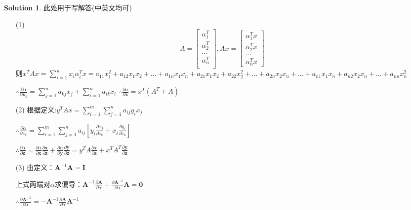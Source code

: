 \documentclass[a4paper,UTF8]{article}
\numberwithin{equation}{section}
\theoremstyle{definition}
\newtheorem*{solution}{Solution}
\def \y {\mathbf{y}}
\def \x {\mathbf{x}}
\def \z {\mathbf{z}}
\begin{document}
\begin{solution}
此处用于写解答(中英文均可) \\
\begin{enumerate}
\item[(1)]
		\begin{equation}
			A = \left[
			\begin{array}{c}
				\alpha_1^{T}  \\
				\alpha_2^{T} \\
				... \\
				\alpha_n^{T} \\
				
			\end{array}
			\right] ,   
			Ax = \left[
			\begin{array}{c}
				\alpha_1^{T}x  \\
				\alpha_2^{T}x \\
				...\\
				\alpha_n^{T}x 
			\end{array}
			\right]
		\end{equation}
		则$x^{T}Ax =  \sum\limits_{i=1}^{n}x_i\alpha_i^{T}x=a_{11}x_1^{2}+a_{12}x_1x_2+...+a_{1n}x_1x_n+a_{21}x_1x_2+a_{22}x_2^{2}+...+a_{2n}x_2x_n+...+a_{n1}x_1x_n+a_{n2}x_2x_n+...+a_{nn}x_n^{2}$
		
		$\therefore \frac{\partial \alpha}{\partial \x_k}=\sum\limits_{j=1}^{n}a_{kj}x_j+\sum\limits_{i=1}^{n}a_{ik}x_i$
          $\therefore \frac{\partial \alpha}{\partial \x}=x^{T}(A^{T}+A)$
          
\item[(2)]
	根据定义:$y^{T}Ax=\sum\limits_{i=1}^{m}\sum\limits_{j=1}^{n}a_{ij}y_ix_j$
	
	$\therefore \frac{\partial \alpha}{\partial z_k} = \sum\limits_{i=1}^{m}\sum\limits_{j=1}^{n}
	a_{ij}\left[y_i\frac{\partial x_j}{\partial z_k} + x_j\frac{\partial y_i}{\partial z_k}\right]
	$    

    $\therefore\frac{\partial \alpha}{\partial \z} 
         = \frac{\partial \alpha}{\partial \x}\frac{\partial \x}{\partial \z} + \frac{\partial \alpha}{\partial \y}\frac{\partial \y}{\partial \z}
         = y^{T}A \frac{\partial \x}{\partial \z} + x^{T}A^{T}\frac{\partial \y}{\partial \z}$


\item[(3)]
由定义：$\mathbf{A}^{-1} \mathbf{A}=\mathbf{I}$

上式两端对$\alpha$求偏导：$\mathbf{A}^{-1} \frac{\partial \mathbf{A}}{\partial \alpha}+\frac{\partial \mathbf{A}^{-1}}{\partial \alpha} \mathbf{A}=\mathbf{0}$

$\therefore\frac{\partial \mathbf{A}^{-1}}{\partial \alpha}=-\mathbf{A}^{-1} \frac{\partial \mathbf{A}}{\partial \alpha} \mathbf{A}^{-1}$
		~\\
		~\\
		~\\
  \end{enumerate}
	\end{solution}
	
\end{document}
